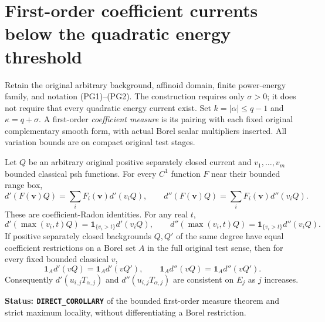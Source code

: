 \section{First-order coefficient currents below the quadratic energy threshold}
\label{sec:r11-first-order-power-currents}

Retain the original arbitrary background, affinoid domain,
finite power-energy family, and notation (PG1)--(PG2).
The construction requires only $\sigma>0$; it does not require
that every quadratic energy current exist.
Set $k=|\alpha|\leq q-1$ and $\kappa=q+\sigma$.
A first-order \emph{coefficient measure} is its pairing with
each fixed original complementary smooth form, with actual
Borel scalar multipliers inserted. All variation bounds
are on compact original test stages.

\begin{lemma}
\label{lem:r11-first-order-borel-locality}
Let $Q$ be an arbitrary original positive separately closed
current and $v_1,\ldots,v_m$ bounded classical psh functions.
For every $C^1$ function $F$ near their bounded range box,
\[
 d'(F(\mathbf v)Q)=\sum_i F_i(\mathbf v)d'(v_iQ),\qquad
 d''(F(\mathbf v)Q)=\sum_i F_i(\mathbf v)d''(v_iQ).
 \tag{FO1}
\]
These are coefficient-Radon identities. For any real $t$,
\[
 d'(\max(v_i,t)Q)=\mathbf1_{\{v_i>t\}}d'(v_iQ),\qquad
 d''(\max(v_i,t)Q)=\mathbf1_{\{v_i>t\}}d''(v_iQ).
 \tag{FO2}
\]
If positive separately closed backgrounds $Q,Q'$ of the
same degree have equal coefficient restrictions on a Borel
set $A$ in the full original test sense, then for every
fixed bounded classical $v$,
\[
 \mathbf1_A d'(vQ)=\mathbf1_A d'(vQ'),\qquad
 \mathbf1_A d''(vQ)=\mathbf1_A d''(vQ').
 \tag{FO3}
\]
Consequently $d'(u_{i,j}T_{\alpha,j})$ and
$d''(u_{i,j}T_{\alpha,j})$ are consistent on $E_j$
as $j$ increases.
\end{lemma}

\noindent\textbf{Status: \texttt{DIRECT\_COROLLARY}} of
the bounded first-order measure theorem and strict maximum
locality, without differentiating a Borel restriction.

